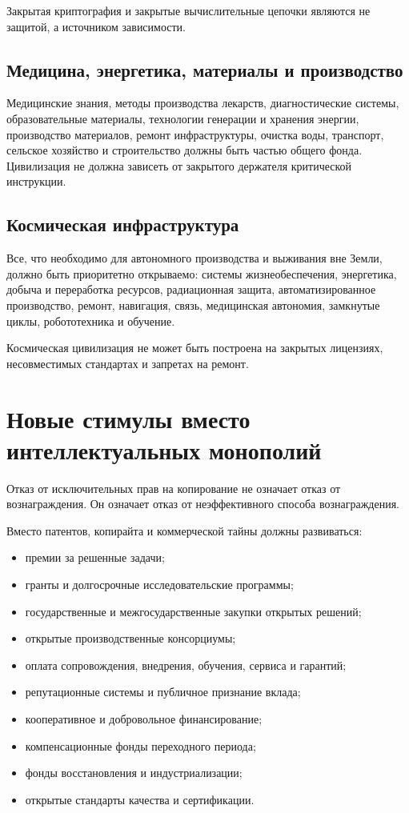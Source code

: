 \documentclass[11pt,a4paper]{article}
\begin{document}
Закрытая криптография и закрытые вычислительные цепочки являются не защитой, а источником зависимости.

\subsection{Медицина, энергетика, материалы и производство}

Медицинские знания, методы производства лекарств, диагностические системы, образовательные материалы, технологии генерации и хранения энергии, производство материалов, ремонт инфраструктуры, очистка воды, транспорт, сельское хозяйство и строительство должны быть частью общего фонда. Цивилизация не должна зависеть от закрытого держателя критической инструкции.

\subsection{Космическая инфраструктура}

Все, что необходимо для автономного производства и выживания вне Земли, должно быть приоритетно открываемо: системы жизнеобеспечения, энергетика, добыча и переработка ресурсов, радиационная защита, автоматизированное производство, ремонт, навигация, связь, медицинская автономия, замкнутые циклы, робототехника и обучение.

Космическая цивилизация не может быть построена на закрытых лицензиях, несовместимых стандартах и запретах на ремонт.

\section{Новые стимулы вместо интеллектуальных монополий}

Отказ от исключительных прав на копирование не означает отказ от вознаграждения. Он означает отказ от неэффективного способа вознаграждения.

Вместо патентов, копирайта и коммерческой тайны должны развиваться:

\begin{itemize}
  \item премии за решенные задачи;
  \item гранты и долгосрочные исследовательские программы;
  \item государственные и межгосударственные закупки открытых решений;
  \item открытые производственные консорциумы;
  \item оплата сопровождения, внедрения, обучения, сервиса и гарантий;
  \item репутационные системы и публичное признание вклада;
  \item кооперативное и добровольное финансирование;
  \item компенсационные фонды переходного периода;
  \item фонды восстановления и индустриализации;
  \item открытые стандарты качества и сертификации.
\end{itemize}
\end{document}
